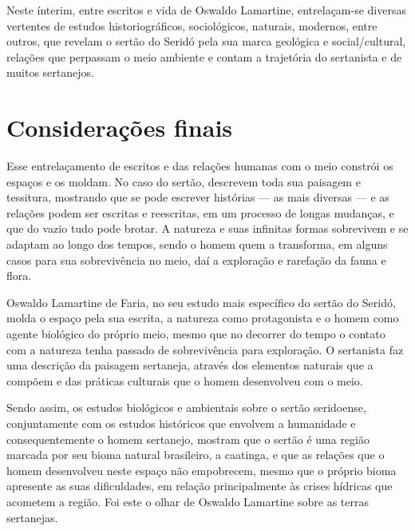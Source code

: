 \begin{refsection}
    Neste ínterim, entre escritos e vida de Oswaldo Lamartine, entrelaçam-se diversas vertentes de estudos historiográficos, sociológicos, naturais, modernos, entre outros, que revelam o sertão do Seridó pela sua marca geológica e social/cultural, relações que perpassam o meio ambiente e contam a trajetória do sertanista e de muitos sertanejos.  


    \section{Considerações finais}

    Esse entrelaçamento de escritos e das relações humanas com o meio constrói os espaços e os moldam. No caso do sertão, descrevem toda sua paisagem e tessitura, mostrando que se pode escrever histórias --- as mais diversas --- e as relações podem ser escritas e reescritas, em um processo de longas mudanças, e que do vazio tudo pode brotar. A natureza e suas infinitas formas sobrevivem e se adaptam ao longo dos tempos, sendo o homem quem a transforma, em alguns casos para sua sobrevivência no meio, daí a exploração e rarefação da fauna e flora. 

    Oswaldo Lamartine de Faria, no seu estudo mais específico do sertão do Seridó, molda o espaço pela sua escrita, a natureza como protagonista e o homem como agente biológico do próprio meio, mesmo que no decorrer do tempo o contato com a natureza tenha passado de sobrevivência para exploração. O sertanista faz uma descrição da paisagem sertaneja, através dos elementos naturais que a compõem e das práticas culturais que o homem desenvolveu com o meio. 

    Sendo assim, os estudos biológicos e ambientais sobre o sertão seridoense, conjuntamente com os estudos históricos que envolvem a humanidade e consequentemente o homem sertanejo, mostram que o sertão é uma região marcada por seu bioma natural brasileiro, a caatinga, e que as relações que o homem desenvolveu neste espaço não empobrecem, mesmo que o próprio bioma apresente as suas dificuldades, em relação principalmente às crises hídricas que acometem a região. Foi este o olhar de Oswaldo Lamartine sobre as terras sertanejas.  

    \printbibliography[heading=subbibliography,notcategory=fullcited]

    \label{chap:oswaldo-lamartine-naend}

\end{refsection}
